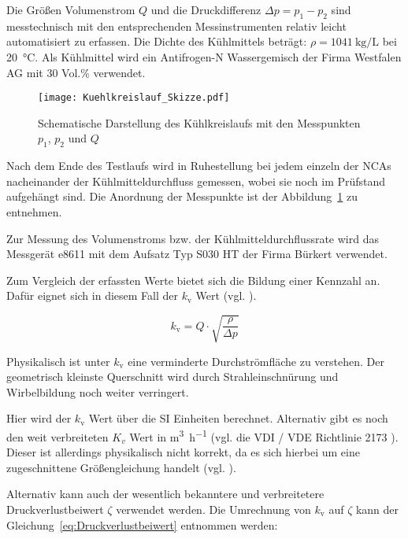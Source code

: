 Die Größen Volumenstrom $Q$ und die Druckdifferenz $\Delta p = p_1 - p_2$ sind messtechnisch mit den entsprechenden Messinstrumenten relativ leicht automatisiert zu erfassen. Die Dichte des Kühlmittels beträgt: $\rho = \SI{1041}{\kilogram\per\liter} $ bei \SI{20}{\degreeCelsius}. Als Kühlmittel wird ein Antifrogen-N Wassergemisch der Firma Westfalen AG mit 30 Vol.\% verwendet.


\begin{figure}[h]
\centering
\texttt{[image: Kuehlkreislauf\_Skizze.pdf]} 
\caption{Schematische Darstellung des Kühlkreislaufs mit den Messpunkten $p_1$, $p_2$ und $Q$ } 
\label{fig:Kuehlkreislauf_Skizze}
\end{figure}


Nach dem Ende des Testlaufs wird in Ruhestellung bei jedem einzeln der NCAs nacheinander der Kühlmitteldurchfluss gemessen, wobei sie noch im Prüfstand aufgehängt sind. Die Anordnung der Messpunkte ist der Abbildung~\ref{fig:Kuehlkreislauf_Skizze} zu entnehmen.

Zur Messung des Volumenstroms bzw. der Kühlmitteldurchflussrate wird das Messgerät e8611 mit dem Aufsatz Typ S030 HT der Firma Bürkert verwendet.

Zum Vergleich der erfassten Werte bietet sich die Bildung einer Kennzahl an. Dafür eignet sich in diesem Fall der $k_\mathrm{v}$ Wert (vgl. \cite{Glueck1988}).

\begin{equation}
 k_\mathrm{v} = Q \cdot  \sqrt{\frac{\rho }{\Delta p}}
\end{equation}

Physikalisch ist unter $k_\mathrm{v}$ eine verminderte Durchströmfläche zu verstehen. Der geometrisch kleinste Querschnitt wird durch Strahleinschnürung und Wirbelbildung noch weiter verringert.


Hier wird der $k_\mathrm{v}$ Wert über die SI Einheiten berechnet. Alternativ gibt es noch den weit verbreiteten $K_v$ Wert in \si{\cubic\meter\per\hour} (vgl. die VDI / VDE Richtlinie 2173 \cite{verband1962vdi}). Dieser ist allerdings physikalisch nicht korrekt, da es sich hierbei um eine zugeschnittene Größengleichung handelt (vgl. \cite{Glueck1988}). 


Alternativ kann auch der wesentlich bekanntere und verbreitetere  Druckverlustbeiwert $\zeta$ verwendet werden. Die Umrechnung von $k_\mathrm{v}$ auf $\zeta$ kann der Gleichung~\ref{eq:Druckverlustbeiwert} entnommen werden: 


